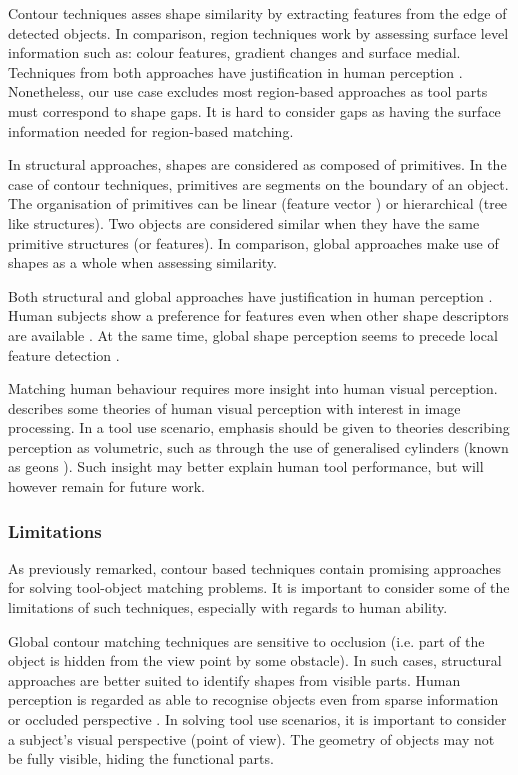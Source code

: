 \documentclass[
    floatsintext
]{article}
\begin{document}
Contour techniques asses shape similarity by extracting features from the edge of detected objects.
In comparison, region techniques work by assessing surface level information such as: colour features, gradient changes and surface medial.
Techniques from both approaches have justification in human perception \cite{chatbri2016}.
Nonetheless, our use case excludes most region-based approaches as tool parts must correspond to shape gaps.
It is hard to consider gaps as having the surface information needed for region-based matching.

In structural approaches, shapes are considered as composed of primitives. In the case of contour techniques, primitives are segments on the boundary of an object.
The organisation of primitives can be linear (feature vector \cite{zhang2004}) or hierarchical (tree like structures\cite{zhu2015}).
Two objects are considered similar when they have the same primitive structures (or features).
In comparison, global approaches make use of shapes as a whole when assessing similarity. 

Both structural and global approaches have justification in human perception \cite{zhang2004}.
Human subjects show a preference for features even when other shape descriptors are available \cite{chatbri2016}.
At the same time, global shape perception seems to precede local feature detection \cite{navon1977}. 

Matching human behaviour requires more insight into human visual perception.
\cite{loncaric1998} describes some theories of human visual perception with interest in image processing.
In a tool use scenario, emphasis should be given to theories describing perception as volumetric, such as through the use of generalised cylinders (known as geons \cite{dickinson2014}).
Such insight may better explain human tool performance, but will however remain for future work.    

\subsubsection{Limitations}
As previously remarked, contour based techniques contain promising approaches for solving tool-object matching problems.
It is important to consider some of the limitations of such techniques, especially with regards to human ability. 

Global contour matching techniques are sensitive to occlusion (i.e. part of the object is hidden from the view point by some obstacle).
In such cases, structural approaches are better suited to identify shapes from visible parts.
Human perception is regarded as able to recognise objects even from sparse information or occluded perspective \cite{loncaric1998}.
In solving tool use scenarios, it is important to consider a subject's visual perspective (point of view).
The geometry of objects may not be fully visible, hiding the functional parts.
\end{document}
